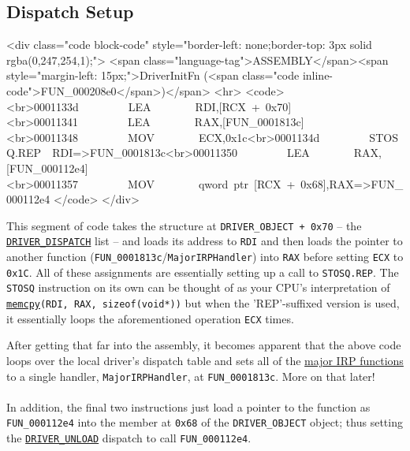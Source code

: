 \medskip

\subsection{Dispatch Setup}

\begin{rawhtml}
<div class="code block-code" style="border-left: none;border-top: 3px solid rgba(0,247,254,1);">
            <span class="language-tag">ASSEMBLY</span><span style="margin-left: 15px;">DriverInitFn (<span class="code inline-code">FUN_000208e0</span>)</span>
            <hr>
            <code>
                <br>0001133d         LEA        RDI,[RCX + 0x70]<br>00011341         LEA        RAX,[FUN_0001813c]<br>00011348         MOV        ECX,0x1c<br>0001134d         STOSQ.REP  RDI=>FUN_0001813c<br>00011350         LEA        RAX,[FUN_000112e4]<br>00011357         MOV        qword ptr [RCX + 0x68],RAX=>FUN_000112e4
            </code>
        </div>
\end{rawhtml}

This segment of code takes the structure at \texttt{DRIVER\_OBJECT + 0x70} -- the
            \texttt{\href{https://learn.microsoft.com/en-us/windows-hardware/drivers/ddi/wdm/nc-wdm-driver_dispatch}{DRIVER\_DISPATCH}} list --
            and loads its address to \texttt{RDI} and then loads the pointer to another function (\texttt{FUN\_0001813c}/\texttt{MajorIRPHandler})
            into \texttt{RAX} before setting \texttt{ECX} to \texttt{0x1C}. All of these
            assignments are essentially setting up a call to \texttt{STOSQ.REP}. The \texttt{STOSQ} instruction on its
            own can be thought of as your CPU's interpretation of \texttt{\href{https://cplusplus.com/reference/cstring/memcpy/}{memcpy}(RDI, RAX, sizeof(void*))}
            but when the 'REP'-suffixed version is used, it essentially loops the aforementioned operation \texttt{ECX} times.

After getting that far into the assembly, it becomes apparent that the above code loops over the local driver's dispatch table and sets all of the \href{https://learn.microsoft.com/en-us/windows-hardware/drivers/kernel/irp-major-function-codes}{major IRP functions}
            to a single handler, \texttt{MajorIRPHandler}, at \texttt{FUN\_0001813c}. More on that later!
        \\
\\

            In addition, the final two instructions just load a pointer to the function as \texttt{FUN\_000112e4} into
            the member at \texttt{0x68} of the \texttt{DRIVER\_OBJECT} object; thus setting
            the \texttt{\href{https://learn.microsoft.com/en-us/windows-hardware/drivers/ddi/wdm/nc-wdm-driver_unload}{DRIVER\_UNLOAD}}
            dispatch to call \texttt{FUN\_000112e4}.

